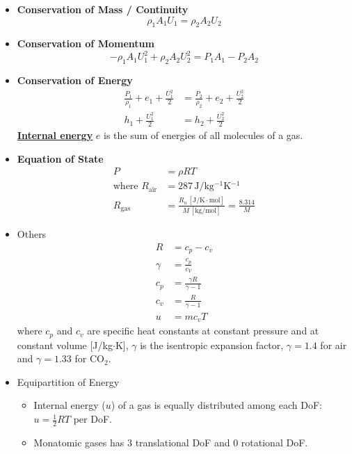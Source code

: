 \begin{itemize}
    \item \color{blue} \textbf{Conservation of Mass / Continuity} \color{black}
    \begin{equation*}
        \rho_1 A_1 U_1 = \rho_2 A_2 U_2
    \end{equation*}
    \item \color{blue} \textbf{Conservation of Momentum} \color{black}
    \begin{equation*}
        -\rho_1 A_1 U_1^2 + \rho_2 A_2 U_2^2 = P_1 A_1 - P_2 A_2 
    \end{equation*}
    \item \color{blue} \textbf{Conservation of Energy} \color{black}
    \begin{align*}
        \frac{P_1}{\rho_1} + e_1 + \frac{U_1^2}{2} &= \frac{P_2}{\rho_2} + e_2 + \frac{U_2^2}{2} \\
        h_1 + \frac{U_1^2}{2} &= h_2 + \frac{U_2^2}{2}
    \end{align*}
    \textbf{\underline{Internal energy}} $e$ is the sum of energies of all molecules of a gas.
    \item \color{blue} \textbf{Equation of State} \color{black}
    \begin{align*}
        P &= \rho R T \\
        \text{where } R_{\text{air}} &= 287 \, \text{J/kg$^{-1}$K$^{-1}$} \\
        R_{\text{gas}} &= \frac{R_u\, [\text{J/K$\cdot$mol}]}{M\,[\text{kg/mol}]} = \frac{8.314}{M}
    \end{align*}
    \item Others
    \begin{align*}
        R &= c_p - c_v \\
        \gamma &= \frac{c_p}{c_V} \\
        c_p &= \frac{\gamma R}{\gamma - 1} \\
        c_v &= \frac{R}{\gamma - 1} \\
        u &= m c_v T
    \end{align*}
    where $c_p$ and $c_v$ are specific heat constants at constant pressure and at constant volume [J/kg$\cdot$K], $\gamma$ is the isentropic expansion factor, $\gamma = 1.4$ for air and $\gamma = 1.33$ for $\text{CO}_2$.
    
    \item Equipartition of Energy
    \begin{itemize}
        \item Internal energy ($u$) of a gas is equally distributed among each DoF: $u = \frac{1}{2} RT$ per DoF.
        \item Monatomic gases has 3 translational DoF and 0 rotational DoF.
    \end{itemize}
\end{itemize}

